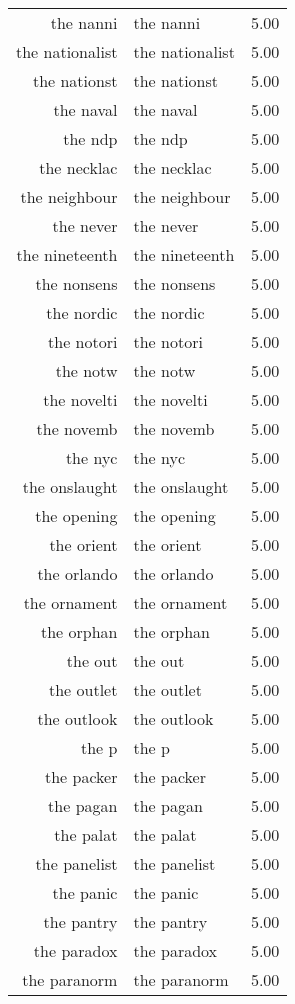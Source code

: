 \begin{table}[ht]
\begin{tabular}{rlr}
  the nanni & the nanni & 5.00 \\ 
  the nationalist & the nationalist & 5.00 \\ 
  the nationst & the nationst & 5.00 \\ 
  the naval & the naval & 5.00 \\ 
  the ndp & the ndp & 5.00 \\ 
  the necklac & the necklac & 5.00 \\ 
  the neighbour & the neighbour & 5.00 \\ 
  the never & the never & 5.00 \\ 
  the nineteenth & the nineteenth & 5.00 \\ 
  the nonsens & the nonsens & 5.00 \\ 
  the nordic & the nordic & 5.00 \\ 
  the notori & the notori & 5.00 \\ 
  the notw & the notw & 5.00 \\ 
  the novelti & the novelti & 5.00 \\ 
  the novemb & the novemb & 5.00 \\ 
  the nyc & the nyc & 5.00 \\ 
  the onslaught & the onslaught & 5.00 \\ 
  the opening & the opening & 5.00 \\ 
  the orient & the orient & 5.00 \\ 
  the orlando & the orlando & 5.00 \\ 
  the ornament & the ornament & 5.00 \\ 
  the orphan & the orphan & 5.00 \\ 
  the out & the out & 5.00 \\ 
  the outlet & the outlet & 5.00 \\ 
  the outlook & the outlook & 5.00 \\ 
  the p & the p & 5.00 \\ 
  the packer & the packer & 5.00 \\ 
  the pagan & the pagan & 5.00 \\ 
  the palat & the palat & 5.00 \\ 
  the panelist & the panelist & 5.00 \\ 
  the panic & the panic & 5.00 \\ 
  the pantry & the pantry & 5.00 \\ 
  the paradox & the paradox & 5.00 \\ 
  the paranorm & the paranorm & 5.00 \\ 

\end{tabular}
\end{table}
